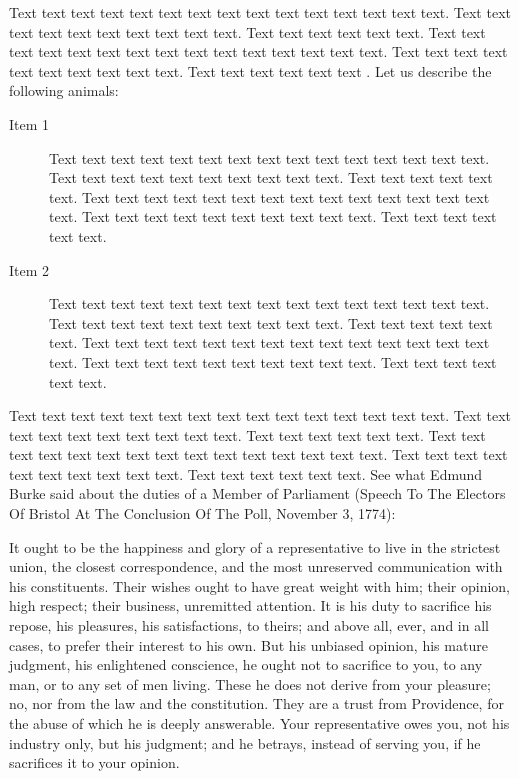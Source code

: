 Text text text text text text text text text text text text text text text. Text text text text text text text text text text. Text text text text text text. Text text text text text text text text text text text text text text text. Text text text text text text text text text text. Text text text text text text \citet{Wells2001}. Let us describe the following animals:

\begin{description}
\item[Item 1] Text text text text text text text text text text text text text text text. Text text text text text text text text text text. Text text text text text text. Text text text text text text text text text text text text text text text. Text text text text text text text text text text. Text text text text text text.
\item[Item 2] Text text text text text text text text text text text text text text text. Text text text text text text text text text text. Text text text text text text. Text text text text text text text text text text text text text text text. Text text text text text text text text text text. Text text text text text text.
\end{description}

Text text text text text text text text text text text text text text text. Text text text text text text text text text text. Text text text text text text. Text text text text text text text text text text text text text text text. Text text text text text text text text text text. Text text text text text text. See what Edmund Burke said about the duties of a Member of Parliament (Speech To The Electors Of Bristol At The Conclusion Of The Poll, November 3, 1774):

\begin{quotesmall}
It ought to be the happiness and glory of a representative to live in the strictest union, the closest correspondence, and the most unreserved communication with his constituents. Their wishes ought to have great weight with him; their opinion, high respect; their business, unremitted attention. It is his duty to sacrifice his repose, his pleasures, his satisfactions, to theirs; and above all, ever, and in all cases, to prefer their interest to his own. But his unbiased opinion, his mature judgment, his enlightened conscience, he ought not to sacrifice to you, to any man, or to any set of men living. These he does not derive from your pleasure; no, nor from the law and the constitution. They are a trust from Providence, for the abuse of which he is deeply answerable. Your representative owes you, not his industry only, but his judgment; and he betrays, instead of serving you, if he sacrifices it to your opinion.
\end{quotesmall}


